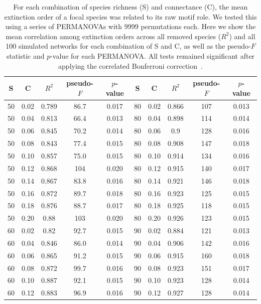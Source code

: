 \documentclass[12pt]{article}
\begin{document}
		\begin{table}[h!]
			\caption{For each combination of species richness (S) and connectance (C), the mean extinction order of a focal species was related to its raw motif role. We tested this using a series of PERMANOVAs with 9999 permutations each. Here we show the mean correlation among extinction orders across all removed species ($R^2$) and all 100 simulated networks for each combination of S and C, as well as the pseudo-$F$ statistic and $p$-value for each PERMANOVA. All tests remained significant after applying the correlated Bonferroni correction~\citep{Drezner2016}.}
			\label{permtable}
			\begin{tabular}{c c | c | c c ||c c | c | c c |}
				S	&	C	&	$R^2$	&	pseudo-$F$	&	$p$-value	&	S	&	C &	$R^2$	&	pseudo-$F$	&	$p$-value\\ 
				\hline
				50	&	0.02	&	0.789	&	86.7	&	0.017	&	80	&	0.02	&	0.866	&	107	&	0.013	\\
				50	&	0.04	&	0.813	&	66.4	&	0.013	&	80	&	0.04	&	0.898	&	114	&	0.014	\\
				50	&	0.06	&	0.845	&	70.2	&	0.014	&	80	&	0.06	&	0.9	&	128	&	0.016	\\  
				50	&	0.08	&	0.843	&	77.4	&	0.015	&	80	&	0.08	&	0.908	&	147	&	0.018	\\
				50	&	0.10	&	0.857	&	75.0	&	0.015	&	80	&	0.10	&	0.914	&	134	&	0.016	\\
				50	&	0.12	&	0.868	&	104	&	0.020	&	80	&	0.12	&	0.915	&	140	&	0.017	\\
				50	&	0.14	&	0.867	&	83.8	&	0.016	&	80	&	0.14	&	0.921	&	146	&	0.018	\\
				50	&	0.16	&	0.872	&	89.7	&	0.018	&	80	&	0.16	&	0.923	&	125	&	0.015	\\
				50	&	0.18	&	0.876	&	88.7	&	0.017	&	80	&	0.18	&	0.925	&	118	&	0.015	\\
				50	&	0.20	&	0.88	&	103	&	0.020	&	80	&	0.20	&	0.926	&	123	&	0.015	\\
				60	&	0.02	&	0.82	&	92.7	&	0.015	&	90	&	0.02	&	0.884	&	121	&	0.013	\\
				60	&	0.04	&	0.846	&	86.0	&	0.014	&	90	&	0.04	&	0.906	&	142	&	0.016	\\
				60	&	0.06	&	0.865	&	91.2	&	0.015	&	90	&	0.06	&	0.915	&	160	&	0.018	\\
				60	&	0.08	&	0.872	&	99.7	&	0.016	&	90	&	0.08	&	0.923	&	151	&	0.017	\\
				60	&	0.10	&	0.887	&	92.1	&	0.015	&	90	&	0.10	&	0.923	&	128	&	0.014	\\
				60	&	0.12	&	0.883	&	96.9	&	0.016	&	90	&	0.12	&	0.927	&	128	&	0.014	\\

\end{tabular}
\end{table}
\end{document}
